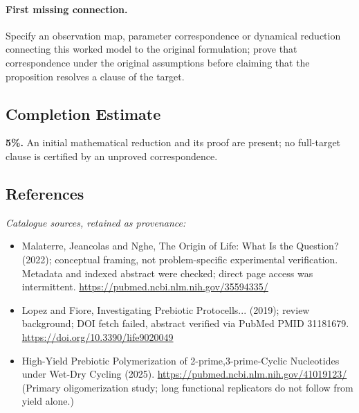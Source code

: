 \documentclass[11pt]{article}
\begin{document}
\paragraph{First missing connection.} Specify an observation map, parameter correspondence or dynamical reduction connecting this worked model to the original formulation; prove that correspondence under the original assumptions before claiming that the proposition resolves a clause of the target.
\subsection{Completion Estimate}
\textbf{5\%.} An initial mathematical reduction and its proof are present; no full-target clause is certified by an unproved correspondence.
\subsection{References}
\noindent\emph{Catalogue sources, retained as provenance:}
\begin{itemize}
\item Malaterre, Jeancolas and Nghe, The Origin of Life: What Is the Question? (2022); conceptual framing, not problem-specific experimental verification. Metadata and indexed abstract were checked; direct page access was intermittent. \url{https://pubmed.ncbi.nlm.nih.gov/35594335/}
\item Lopez and Fiore, Investigating Prebiotic Protocells... (2019); review background; DOI fetch failed, abstract verified via PubMed PMID 31181679. \url{https://doi.org/10.3390/life9020049}
\item High-Yield Prebiotic Polymerization of 2-prime,3-prime-Cyclic Nucleotides under Wet-Dry Cycling (2025). \url{https://pubmed.ncbi.nlm.nih.gov/41019123/} (Primary oligomerization study; long functional replicators do not follow from yield alone.)
\end{itemize}
\clearpage


\appendix
\end{document}
